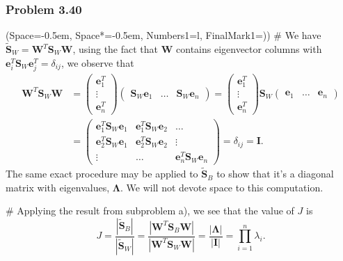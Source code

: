 \documentclass[12pt, a4paper]{article}
\newcommand{\listSpace}{-0.5em}%
\newcommand{\vect}[1]{\bm{#1}}
\newcommand{\abs}[1]{\left\lvert#1\right\rvert}
\begin{document}
\subsubsection*{Problem 3.40}
\begin{easylist}[enumerate]
\ListProperties(Space=\listSpace, Space*=\listSpace, Numbers1=l, FinalMark1={)})
# We have $\tilde{\vect{S}}_W = \vect{W}^T \vect{S}_W \vect{W}$, using the fact that $\vect{W}$ contains eigenvector columns with $\vect{e}^T_i \vect{S}_W \vect{e}^T_j = \delta_{ij}$, we observe that 
\begin{align*}
\vect{W}^T \vect{S}_W \vect{W}
& =
\begin{pmatrix}
\vect{e}_1^T \\ 
\vdots \\ 
\vect{e}_n^T
\end{pmatrix}
\begin{pmatrix}
\vect{S}_W\vect{e}_1 & \dots & \vect{S}_W\vect{e}_n
\end{pmatrix}
=
	\begin{pmatrix}
	\vect{e}_1^T \\ 
	\vdots \\ 
	\vect{e}_n^T
	\end{pmatrix}
	\vect{S}_W
	\begin{pmatrix}
	\vect{e}_1 & \dots & \vect{e}_n
	\end{pmatrix} \\
	&=
	\begin{pmatrix}
	\vect{e}_1^T \vect{S}_W \vect{e}_1 & \vect{e}_1^T \vect{S}_W \vect{e}_2 & \dots \\ 
	\vect{e}_2^T \vect{S}_W \vect{e}_1 & \vect{e}_2^T \vect{S}_W \vect{e}_2 & \vdots \\ 
	\vdots & \dots & \vect{e}_n^T \vect{S}_W \vect{e}_n
	\end{pmatrix}
	= \delta_{ij} = \vect{I}.
\end{align*}
The same exact procedure may be applied to $\tilde{\vect{S}}_B$ to show that it's a diagonal matrix with eigenvalues, $\vect{\Lambda}$. 
We will not devote space to this computation.

# Applying the result from subproblem a), we see that the value of $J$ is
\begin{equation*}
	J = \frac{\abs{\tilde{\vect{S}}_B}}{\abs{\tilde{\vect{S}}_W}}
	= \frac{\abs{\vect{W}^T \vect{S}_B \vect{W}}}{\abs{\vect{W}^T \vect{S}_W \vect{W}}}
	=
	\frac{\abs{\vect{\Lambda}}}{\abs{\vect{I}}} = \prod_{i = 1}^{n} \lambda_i.
\end{equation*}


\end{easylist}
\end{document}
